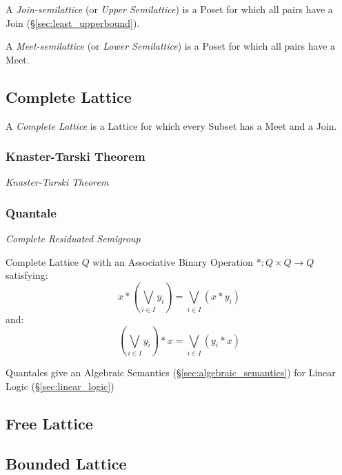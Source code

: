 A \emph{Join-semilattice} (or \emph{Upper Semilattice}) is a Poset for
which all pairs have a Join (\S\ref{sec:least_upperbound}).

A \emph{Meet-semilattice} (or \emph{Lower Semilattice}) is a Poset for
which all pairs have a Meet.



\subsection{Complete Lattice}\label{sec:complete_lattice}

A \emph{Complete Lattice} is a Lattice for which every Subset has a
Meet and a Join.



\subsubsection{Knaster-Tarski Theorem}\label{sec:knaster_tarski}

\emph{Knaster-Tarski Theorem}



\subsubsection{Quantale}\label{sec:quantale}

\emph{Complete Residuated Semigroup}

Complete Lattice $Q$ with an Associative Binary Operation $* : Q
\times Q \rightarrow Q$ satisfying:
\[
  x*(\bigvee_{i \in I} y_i) = \bigvee_{i \in I}(x * y_i)
\]
and:
\[
  (\bigvee_{i \in I} y_i)*x = \bigvee_{i \in I}(y_i * x)
\]

Quantales give an Algebraic Semantics
(\S\ref{sec:algebraic_semantics}) for Linear Logic
(\S\ref{sec:linear_logic})



\subsection{Free Lattice}\label{sec:free_lattice}

\subsection{Bounded Lattice}\label{sec:bounded_lattice}

